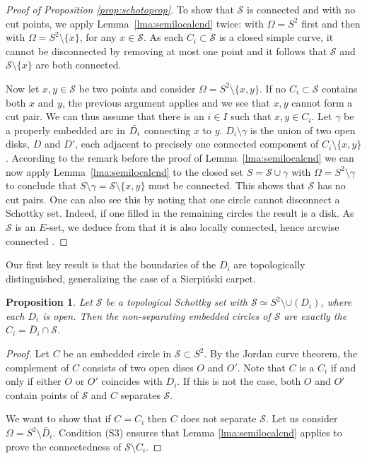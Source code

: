 \documentclass[11pt]{article}
\newtheorem{proposition}[theorem]{Proposition}
\theoremstyle{definition}
\begin{document}
\begin{proof}[Proof of Proposition \ref{prop:schotoprop}] To show that $\mathcal{S}$ is connected and with no cut points, we apply Lemma~\ref{lma:semilocalcnd} twice: with $\Omega =S^2$ first and then
with $\Omega=S^2\setminus \{x\}$, for any $x\in \mathcal{S}$. As each
 $C_i\subset \mathcal{S}$  is a closed simple curve, it cannot be disconnected by removing at most one point and it follows that $\mathcal{S}$ and $\mathcal{S}\setminus \{x\}$ are both connected.

Now let $x,y\in \mathcal{S}$ be two points and consider $\Omega=S^2\setminus \{x,y\}$. If no 
$C_i \subset \mathcal{S}$ contains both $x$ and $y$, the previous argument applies and we see that $x,y$ cannot form a cut pair. We can thus assume that there is an $i\in I$ such that $x,y\in C_i$. Let $\gamma$ be a properly embedded arc in $\Bar{D_i}$ connecting $x$ to $y$. $D_i\setminus\gamma$ is the union of two open disks, $D$ and $D'$, each adjacent to precisely one connected component of $C_i\setminus\{x,y\}$.  According to the remark before the proof of Lemma~\ref{lma:semilocalcnd} we can now apply Lemma~\ref{lma:semilocalcnd} to the closed set $S=\mathcal{S}\cup \gamma$ with $\Omega=S^2\setminus\gamma$  to conclude that $S\setminus\gamma=\mathcal{S}\setminus \{x,y\}$ must be connected. 
This shows that $\mathcal{S}$ has no cut pairs. One can also see this by noting that one circle cannot disconnect a Schottky set. Indeed, if one filled in the remaining circles the result is a disk. 
As $\mathcal{S}$ is an $E$-set, we deduce from \cite[Theorem VI.4.4]{whyburnantop} that it is also locally connected, hence arcwise connected \cite[Theorem II.5.1]{whyburnantop}.
\end{proof}



Our first key result is that the boundaries of the $D_i$ are topologically distinguished, generalizing the case of a Sierpi\'nski carpet. 


\begin{proposition}
\label{boundarychar} 
 Let $\mathcal{S}$ be a topological Schottky set with $\mathcal{S} \simeq 
S^2 \setminus \cup(D_i)$, where each $D_i$ is open. Then the non-separating 
embedded circles of $\mathcal{S}$ are exactly the 
$C_i=\bar D_i \cap \mathcal{S}$. 
\end{proposition}

\begin{proof}
Let $C$ be an embedded circle in $\mathcal{S}\subset S^2$. By the Jordan curve
theorem, the complement of $C$ consists of two open discs $O$ and $O'$. 
Note that $C$ is a $C_i$ if and
only if either $O$ or $O'$ coincides with $D_i$. If this is not the case, both 
$O$ and $O'$ contain points of $\mathcal{S}$ and $C$ separates $\mathcal{S}$.

We want to show that if $C=C_i$ then $C$ does not separate $\mathcal{S}$.
Let us consider $\Omega = S^2\setminus \bar D_i$. Condition (S3) ensures that Lemma
\ref{lma:semilocalcnd} applies to prove the connectedness of $\mathcal{S}\setminus C_i$.
\end{proof}
\end{document}
